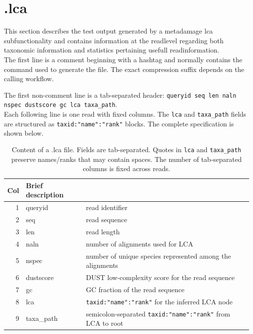 \documentclass[10pt]{article}
\begin{document}
\section{.lca} \label{sec:lca}
This section describes the test output generated by a metadamage lca subfunctionality and contains information at the readlevel regarding both taxonomic information and statistics pertaining usefull readinformation.\\

The first line is a comment beginning with a hashtag and normally contains the
command used to generate the file. The exact compression suffix depends on the
calling workflow.

The first non-comment line is a tab-separated header:
\texttt{queryid seq len naln nspec dustscore gc lca taxa\_path}.\\
Each following line is one read with fixed columns. The \texttt{lca} and \texttt{taxa\_path}
fields are structured as \texttt{taxid:"name":"rank"} blocks.
The complete specification is shown below.

\begin{table}[h]
\begin{tabular}{rll}
  \hline
  {\bf Col} & {\bf Brief description} \\
  \hline
  1 & {\sf queryid} & read identifier\\
  2 & {\sf seq} & read sequence\\
  3 & {\sf len} & read length\\
  4 & {\sf naln} & number of alignments used for LCA\\
  5 & {\sf nspec} & number of unique species represented among the alignments\\
  6 & {\sf dustscore} & DUST low-complexity score for the read sequence\\
  7 & {\sf gc} & GC fraction of the read sequence\\
  8 & {\sf lca} & \texttt{taxid:"name":"rank"} for the inferred LCA node\\
  9 & {\sf taxa\_path} & semicolon-separated \texttt{taxid:"name":"rank"} from LCA to root\\\hline
\end{tabular}\label{tab2}
\caption{Content of a .lca file. Fields are tab-separated.
  Quotes in \texttt{lca} and \texttt{taxa\_path} preserve names/ranks that may contain spaces.
  The number of tab-separated columns is fixed across reads.}
\end{table}
\end{document}
